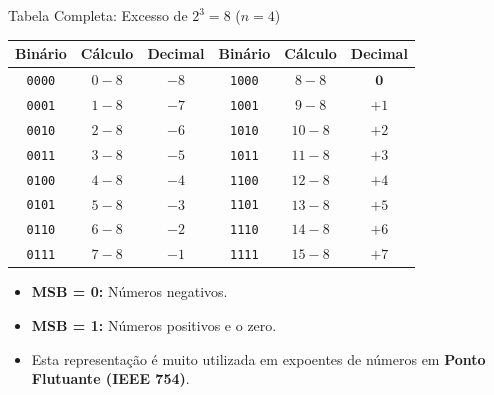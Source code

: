 \begin{frame}{Tabela Completa: Excesso de $2^{3}=8$ ($n=4$)}
    \begin{center}
        \footnotesize
        \begin{tabular}{|c|c|c||c|c|c|}
            \hline
            \textbf{Binário} & \textbf{Cálculo} & \textbf{Decimal} & \textbf{Binário} & \textbf{Cálculo} & \textbf{Decimal} \\ \hline \hline
            \texttt{0000}    & $0 - 8$          & $-8$             & \texttt{1000}    & $8 - 8$          & $\mathbf{0}$     \\ \hline
            \texttt{0001}    & $1 - 8$          & $-7$             & \texttt{1001}    & $9 - 8$          & $+1$             \\ \hline
            \texttt{0010}    & $2 - 8$          & $-6$             & \texttt{1010}    & $10 - 8$         & $+2$             \\ \hline
            \texttt{0011}    & $3 - 8$          & $-5$             & \texttt{1011}    & $11 - 8$         & $+3$             \\ \hline
            \texttt{0100}    & $4 - 8$          & $-4$             & \texttt{1100}    & $12 - 8$         & $+4$             \\ \hline
            \texttt{0101}    & $5 - 8$          & $-3$             & \texttt{1101}    & $13 - 8$         & $+5$             \\ \hline
            \texttt{0110}    & $6 - 8$          & $-2$             & \texttt{1110}    & $14 - 8$         & $+6$             \\ \hline
            \texttt{0111}    & $7 - 8$          & $-1$             & \texttt{1111}    & $15 - 8$         & $+7$             \\ \hline
        \end{tabular}
    \end{center}

    \begin{itemize}
        \item \textbf{MSB = 0:} Números negativos.
        \item \textbf{MSB = 1:} Números positivos e o zero.
        \item Esta representação é muito utilizada em expoentes de números em \textbf{Ponto Flutuante (IEEE 754)}.
    \end{itemize}
\end{frame}



